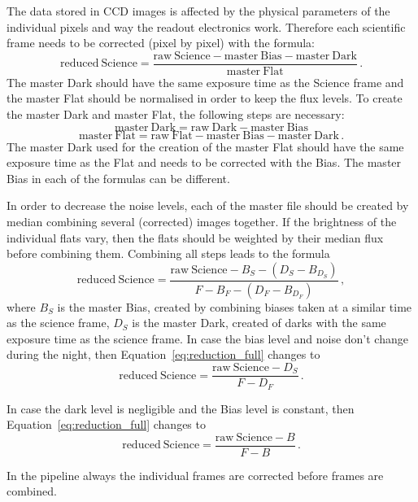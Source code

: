 \documentclass[10pt,a4paper]{article}
\begin{document}
The data stored in CCD images is affected by the physical parameters of the individual pixels and way the readout electronics work. Therefore each scientific frame needs to be corrected (pixel by pixel) with the formula:
\begin{equation}
  \mathrm{reduced\ Science} = \frac{\mathrm{raw\ Science} - \mathrm{master\ Bias} - \mathrm{master\ Dark}}{\mathrm{master\ Flat}}\,.
\end{equation}
The master Dark should have the same exposure time as the Science frame and the master Flat should be normalised in order to keep the flux levels. To create the master Dark and master Flat, the following steps are necessary:
\begin{equation}
  \mathrm{master\ Dark} = \mathrm{raw\ Dark} - \mathrm{master\ Bias}
\end{equation}
\begin{equation}
  \mathrm{master\ Flat} = \mathrm{raw\ Flat} - \mathrm{master\ Bias} - \mathrm{master\ Dark}\,.
\end{equation}
The master Dark used for the creation of the master Flat should have the same exposure time as the Flat and needs to be corrected with the Bias. The master Bias in each of the formulas can be different.

In order to decrease the noise levels, each of the master file should be created by median combining several (corrected) images together. If the brightness of the individual flats vary, then the flats should be weighted by their median flux before combining them. Combining all steps leads to the formula
\begin{equation}
  \label{eq:reduction_full}
  \mathrm{reduced\ Science} = \frac{\mathrm{raw\ Science} - B_S - (D_S - B_{D_S})}{F - B_F - (D_F - B_{D_F})}\,,
\end{equation}
where $B_S$ is the master Bias, created by combining biases taken at a similar time as the science frame, $D_S$ is the master Dark, created of darks with the same exposure time as the science frame. In case the bias level and noise don't change during the night, then Equation~\ref{eq:reduction_full} changes to
\begin{equation}
  \mathrm{reduced\ Science} = \frac{\mathrm{raw\ Science} - D_S}{F - D_F}\,.
\end{equation}

In case the dark level is negligible and the Bias level is constant, then Equation~\ref{eq:reduction_full} changes to
\begin{equation}
  \mathrm{reduced\ Science} = \frac{\mathrm{raw\ Science} - B}{F - B}\,.
\end{equation}


In the pipeline always the individual frames are corrected before frames are combined.
\end{document}
